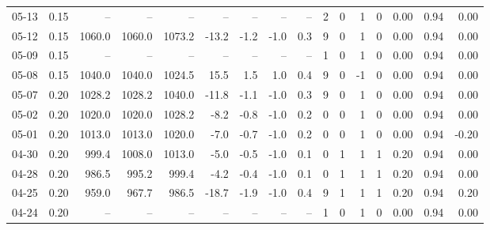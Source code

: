 \begin{threeparttable}
{\begin{tabular}{lrrrrrrrrrrrrrrr}
  05-13 &     0.15 &     -- &     -- &     -- &         -- &             -- &                       -- &                  -- &              2 &         0 &     1 &         0 &       0.00 &      0.94 &           0.00 \\
  05-12 &     0.15 & 1060.0 & 1060.0 & 1073.2 &      -13.2 &           -1.2 &                     -1.0 &                 0.3 &              9 &         0 &     1 &         0 &       0.00 &      0.94 &           0.00 \\
  05-09 &     0.15 &     -- &     -- &     -- &         -- &             -- &                       -- &                  -- &              1 &         0 &     1 &         0 &       0.00 &      0.94 &           0.00 \\
  05-08 &     0.15 & 1040.0 & 1040.0 & 1024.5 &       15.5 &            1.5 &                      1.0 &                 0.4 &              9 &         0 &    -1 &         0 &       0.00 &      0.94 &           0.00 \\
  05-07 &     0.20 & 1028.2 & 1028.2 & 1040.0 &      -11.8 &           -1.1 &                     -1.0 &                 0.3 &              9 &         0 &     1 &         0 &       0.00 &      0.94 &           0.00 \\
  05-02 &     0.20 & 1020.0 & 1020.0 & 1028.2 &       -8.2 &           -0.8 &                     -1.0 &                 0.2 &              0 &         0 &     1 &         0 &       0.00 &      0.94 &           0.00 \\
  05-01 &     0.20 & 1013.0 & 1013.0 & 1020.0 &       -7.0 &           -0.7 &                     -1.0 &                 0.2 &              0 &         0 &     1 &         0 &       0.00 &      0.94 &          -0.20 \\
  04-30 &     0.20 &  999.4 & 1008.0 & 1013.0 &       -5.0 &           -0.5 &                     -1.0 &                 0.1 &              0 &         1 &     1 &         1 &       0.20 &      0.94 &           0.00 \\
  04-28 &     0.20 &  986.5 &  995.2 &  999.4 &       -4.2 &           -0.4 &                     -1.0 &                 0.1 &              0 &         1 &     1 &         1 &       0.20 &      0.94 &           0.00 \\
  04-25 &     0.20 &  959.0 &  967.7 &  986.5 &      -18.7 &           -1.9 &                     -1.0 &                 0.4 &              9 &         1 &     1 &         1 &       0.20 &      0.94 &           0.20 \\
  04-24 &     0.20 &     -- &     -- &     -- &         -- &             -- &                       -- &                  -- &              1 &         0 &     1 &         0 &       0.00 &      0.94 &           0.00 \\

\end{tabular}}
\end{threeparttable}
